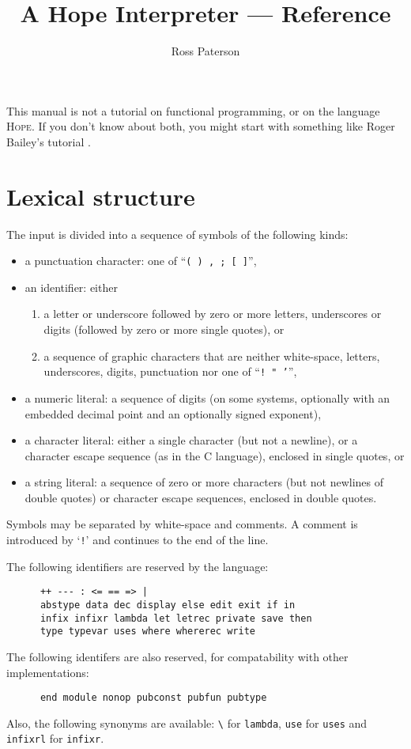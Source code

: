 \documentclass[11pt]{article}
\newcommand{\Hope}{{\scshape Hope}}
\newcommand{\Samp}[1]{\textup{\textmd{\texttt{#1}}}}
\newcommand{\N}[1]{\mbox{#1}}
\newcommand{\Section}[2]{\section{#2}\label{sec:#1}}
\begin{document}
\title{A Hope Interpreter --- Reference}
\author{Ross Paterson}
\maketitle


This manual is not a tutorial on functional programming,
or on the language \Hope.
If you don't know about both, you might start with something like
Roger Bailey's tutorial \cite{tutorial}.

\Section{lexical}{Lexical structure}

The input is divided into a sequence of symbols of the following kinds:
\begin{itemize}
\item
a punctuation character: one of ``\Samp{( ) , ; [ ]}'',
\item
an identifier:
either
\begin{enumerate}
\item
a letter or underscore followed by zero or more letters, underscores or digits
(followed by zero or more single quotes), or
\item
a sequence of graphic characters that are neither white-space, letters,
underscores, digits, punctuation nor one of ``\Samp{\N{!} " '}'',
\end{enumerate}
\item
\label{numbers}a numeric literal:
a sequence of digits
(on some systems, optionally with an embedded decimal point
and an optionally signed exponent),
\item
a character literal:
either a single character (but not a newline),
or a character escape sequence (as in the C language),
enclosed in single quotes, or
\item
a string literal:
a sequence of zero or more characters
(but not newlines of double quotes) or character escape sequences,
enclosed in double quotes.
\end{itemize}

Symbols may be separated by white-space and comments.
A comment is introduced by `\Samp{!}' and continues to the end of the line.

The following identifiers are reserved by the language:
\begin{verbatim}
      ++ --- : <= == => |
      abstype data dec display else edit exit if in
      infix infixr lambda let letrec private save then
      type typevar uses where whererec write
\end{verbatim}
The following identifers are also reserved,
for compatability with other implementations:
\begin{verbatim}
      end module nonop pubconst pubfun pubtype
\end{verbatim}
Also, the following synonyms are available:
\verb|\| for \Samp{lambda},
\Samp{use} for \Samp{uses} and
\Samp{infixrl} for \Samp{infixr}.
\end{document}
